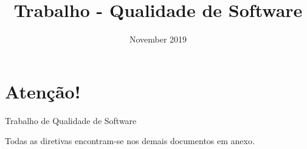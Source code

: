 \documentclass{article}
\title{Trabalho - Qualidade de Software}
\author{ }
\date{November 2019}
\begin{document}
\maketitle
\section*{Atenção!}

Trabalho de Qualidade de Software


Todas as diretivas encontram-se nos demais documentos em anexo.
\end{document}
